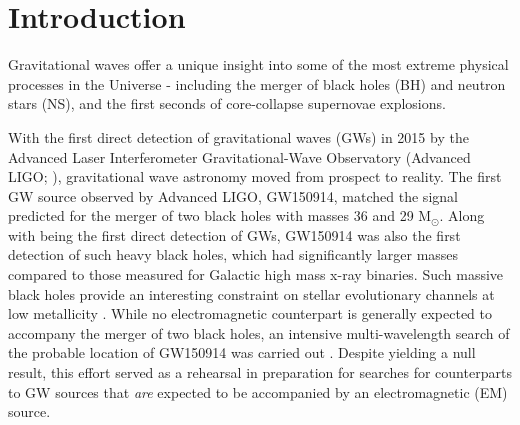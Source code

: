 \documentclass{aa}
\begin{document}
{%
}
\maketitle

\section{Introduction}

Gravitational waves offer a unique insight into some of the most extreme physical processes in the Universe - including the merger of black holes (BH) and neutron stars (NS), and the first seconds of core-collapse supernovae explosions. 

With the first direct detection of gravitational waves (GWs) in 2015 by the Advanced Laser Interferometer Gravitational-Wave
Observatory (Advanced LIGO; \citealp{FirstGW}), gravitational wave astronomy moved from prospect to reality. The first GW source observed by Advanced LIGO, GW150914, matched the signal predicted for the merger of two black holes with masses 36 and 29 M$_{\odot}$. Along with being the first direct detection of GWs, GW150914 was also the first detection of such heavy black holes, which had significantly larger masses compared to those measured for Galactic high mass x-ray binaries. Such massive black holes provide an interesting constraint on stellar evolutionary channels at low metallicity \citep[e.g.][]{FirstGW_astro, Belc16}. While no electromagnetic counterpart is generally expected to accompany the merger of two black holes, an intensive multi-wavelength search of the probable location of GW150914 was carried out \citep{FirstGW_EM}. Despite yielding a null result, this effort served as a rehearsal in preparation for searches for counterparts to GW sources that {\it are} expected to be accompanied by an 
electromagnetic (EM) source.
\end{document}
